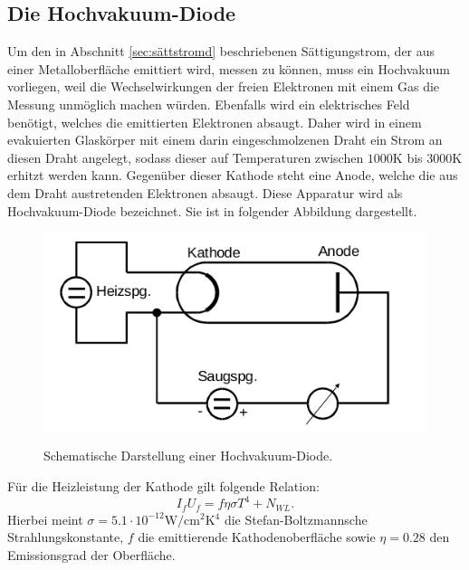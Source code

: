 \subsection{Die Hochvakuum-Diode}
\label{sec:hochvak}
Um den in Abschnitt \ref{sec:sättstromd} beschriebenen Sättigungstrom, der aus
einer Metalloberfläche emittiert wird, messen zu können, muss ein Hochvakuum
vorliegen, weil die Wechselwirkungen der freien Elektronen mit einem Gas die
Messung unmöglich machen würden. Ebenfalls wird ein elektrisches Feld benötigt,
welches die emittierten Elektronen absaugt. Daher wird in einem evakuierten
Glaskörper mit einem darin eingeschmolzenen Draht ein Strom an diesen Draht angelegt,
sodass dieser auf Temperaturen zwischen $1000 \si{\kelvin}$ bis $3000 \si{\kelvin}$
erhitzt werden kann. Gegenüber dieser Kathode steht eine Anode, welche die aus
dem Draht austretenden Elektronen absaugt. Diese Apparatur wird als
Hochvakuum-Diode bezeichnet. Sie ist in folgender Abbildung dargestellt.
\begin{figure}[H]
  \centering
  \includegraphics[scale=0.5]{content/hochvakuumdiode.png}
  \label{fig:hochvakuumd}
  \caption{Schematische Darstellung einer Hochvakuum-Diode. \cite{AP01}}
\end{figure}
\noindent
Für die Heizleistung der Kathode gilt folgende Relation:
\begin{equation}
  I_f U_f = f \eta \sigma T^4 + N_{WL}.
  \label{eqn:heizleistung}
\end{equation}
Hierbei meint $\sigma = 5.1 \cdot 10^{-12}\si{\watt\per\centi\meter\squared\kelvin^4}$
die Stefan-Boltzmannsche Strahlungskonstante, $f$ die emittierende Kathodenoberfläche
sowie $\eta = 0.28$ den Emissionsgrad der Oberfläche.

